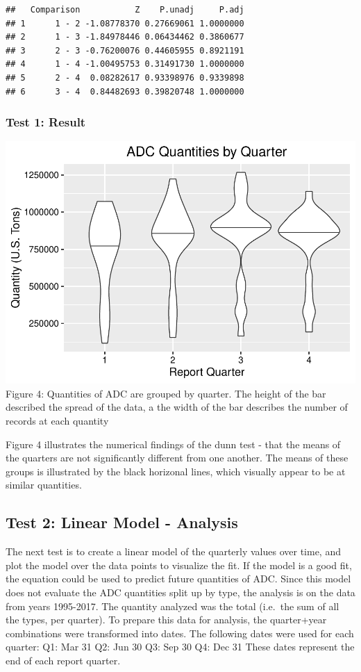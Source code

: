 \documentclass[12pt,]{article}
\begin{document}
\begin{verbatim}
##   Comparison           Z    P.unadj     P.adj
## 1      1 - 2 -1.08778370 0.27669061 1.0000000
## 2      1 - 3 -1.84978446 0.06434462 0.3860677
## 3      2 - 3 -0.76200076 0.44605955 0.8921191
## 4      1 - 4 -1.00495753 0.31491730 1.0000000
## 5      2 - 4  0.08282617 0.93398976 0.9339898
## 6      3 - 4  0.84482693 0.39820748 1.0000000
\end{verbatim}

\subsubsection{Test 1: Result}\label{test-1-result}

\includegraphics{SKo_Project_Template_files/figure-latex/Test1_2-1.pdf}
Figure 4: Quantities of ADC are grouped by quarter. The height of the
bar described the spread of the data, a the width of the bar describes
the number of records at each quantity

Figure 4 illustrates the numerical findings of the dunn test - that the
means of the quarters are not significantly different from one another.
The means of these groups is illustrated by the black horizonal lines,
which visually appear to be at similar quantities.

\subsection{Test 2: Linear Model -
Analysis}\label{test-2-linear-model---analysis}

The next test is to create a linear model of the quarterly values over
time, and plot the model over the data points to visualize the fit. If
the model is a good fit, the equation could be used to predict future
quantities of ADC. Since this model does not evaluate the ADC quantities
split up by type, the analysis is on the data from years 1995-2017. The
quantity analyzed was the total (i.e.~the sum of all the types, per
quarter). To prepare this data for analysis, the quarter+year
combinations were transformed into dates. The following dates were used
for each quarter: Q1: Mar 31 Q2: Jun 30 Q3: Sep 30 Q4: Dec 31 These
dates represent the end of each report quarter.
\end{document}
